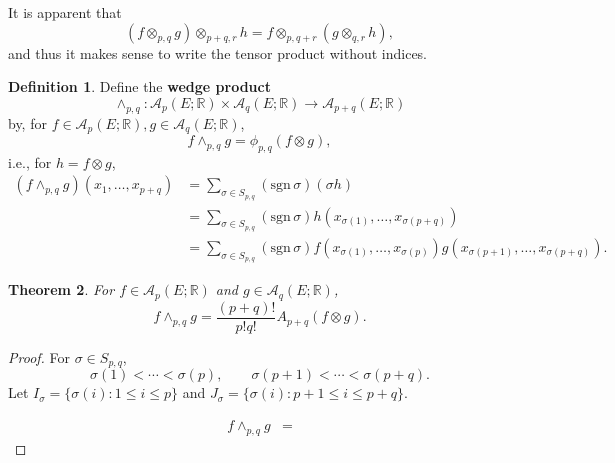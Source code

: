\documentclass{amsart}
\newcommand{\sgn}{\mathrm{sgn}\,}
\newtheorem{theorem}{Theorem}
\theoremstyle{definition}
\newtheorem{definition}[theorem]{Definition}
\begin{document}
It is apparent that
\[
(f \otimes_{p,q} g) \otimes_{p+q,r} h 
=f \otimes_{p,q+r} (g \otimes_{q,r} h),
\]
and thus it makes sense to write the tensor product without indices.

\begin{definition}
Define the \textbf{wedge product} 
\[
\wedge_{p,q}:\mathscr{A}_p(E;\mathbb{R}) \times \mathscr{A}_q(E;\mathbb{R}) \to 
\mathscr{A}_{p+q}(E;\mathbb{R})
\]
by, for $f \in \mathscr{A}_p(E;\mathbb{R}), g \in \mathscr{A}_q(E;\mathbb{R})$,
\[
f \wedge_{p,q} g = \phi_{p,q}(f \otimes g),
\]
i.e., for $h = f \otimes g$,
\begin{align*}
(f \wedge_{p,q} g)(x_1,\ldots,x_{p+q}) &= 
\sum_{\sigma \in S_{p,q}} (\sgn \sigma) (\sigma h)\\
&=\sum_{\sigma \in S_{p,q}} (\sgn \sigma) h(x_{\sigma(1)},\ldots,x_{\sigma(p+q)})\\
&=\sum_{\sigma \in S_{p,q}} (\sgn \sigma) f(x_{\sigma(1)},\ldots,x_{\sigma(p)}) g(x_{\sigma(p+1)},\ldots,x_{\sigma(p+q)}).
\end{align*}
\end{definition}


\begin{theorem}
For $f \in \mathscr{A}_p(E;\mathbb{R})$ and $g \in \mathscr{A}_q(E;\mathbb{R})$,
\[
f \wedge_{p,q} g = \frac{(p+q)!}{p!q!} A_{p+q}(f \otimes g).
\]
\end{theorem}
\begin{proof}
For $\sigma \in S_{p,q}$,
\[
\sigma(1)<\cdots<\sigma(p),\qquad \sigma(p+1)<\cdots<\sigma(p+q).
\]
Let $I_\sigma=\{\sigma(i): 1 \leq i \leq p\}$ and $J_\sigma = 
\{\sigma(i): p+1 \leq i \leq p+q\}$. 

\begin{align*}
f \wedge_{p,q} g&=
\end{align*}
\end{proof}
\end{document}
